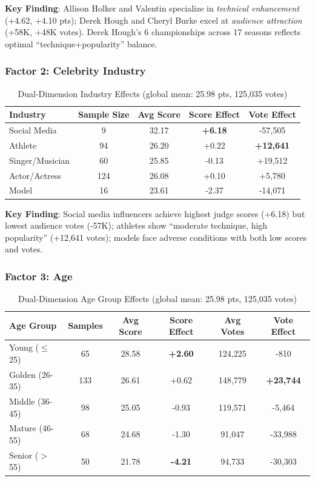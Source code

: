 \textbf{Key Finding}: Allison Holker and Valentin specialize in \textit{technical enhancement} (+4.62, +4.10 pts); Derek Hough and Cheryl Burke excel at \textit{audience attraction} (+58K, +48K votes). Derek Hough's 6 championships across 17 seasons reflects optimal ``technique+popularity'' balance.

\subsubsection{Factor 2: Celebrity Industry}

\begin{table}[h]
\centering
\small
\begin{tabular}{lcccc}
\hline
\textbf{Industry} & \textbf{Sample Size} & \textbf{Avg Score} & \textbf{Score Effect} & \textbf{Vote Effect} \\
\hline
Social Media & 9 & 32.17 & \textbf{+6.18} & -57,505 \\
Athlete & 94 & 26.20 & +0.22 & \textbf{+12,641} \\
Singer/Musician & 60 & 25.85 & -0.13 & +19,512 \\
Actor/Actress & 124 & 26.08 & +0.10 & +5,780 \\
Model & 16 & 23.61 & -2.37 & -14,071 \\
\hline
\end{tabular}
\caption{Dual-Dimension Industry Effects (global mean: 25.98 pts, 125,035 votes)}
\label{tab:industry_effect}
\end{table}

\textbf{Key Finding}: Social media influencers achieve highest judge scores (+6.18) but lowest audience votes (-57K); athletes show ``moderate technique, high popularity'' (+12,641 votes); models face adverse conditions with both low scores and votes.

\subsubsection{Factor 3: Age}

\begin{table}[h]
\centering
\small
\begin{tabular}{lccccc}
\hline
\textbf{Age Group} & \textbf{Samples} & \textbf{Avg Score} & \textbf{Score Effect} & \textbf{Avg Votes} & \textbf{Vote Effect} \\
\hline
Young ($\leq$25) & 65 & 28.58 & \textbf{+2.60} & 124,225 & -810 \\
Golden (26-35) & 133 & 26.61 & +0.62 & 148,779 & \textbf{+23,744} \\
Middle (36-45) & 98 & 25.05 & -0.93 & 119,571 & -5,464 \\
Mature (46-55) & 68 & 24.68 & -1.30 & 91,047 & -33,988 \\
Senior ($>$55) & 50 & 21.78 & \textbf{-4.21} & 94,733 & -30,303 \\
\hline
\end{tabular}
\caption{Dual-Dimension Age Group Effects (global mean: 25.98 pts, 125,035 votes)}
\label{tab:age_effect}
\end{table}

